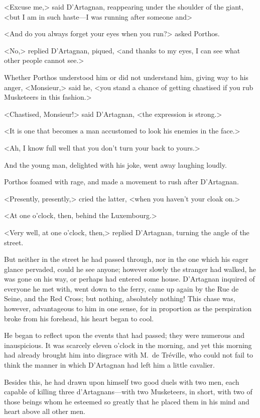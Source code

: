 <Excuse me,> said D'Artagnan, reappearing under the shoulder of the giant, <but I am in such haste—I was running after someone and\longdash> 

<And do you always forget your eyes when you run?> asked Porthos. 

<No,> replied D'Artagnan, piqued, <and thanks to my eyes, I can see what other people cannot see.> 

Whether Porthos understood him or did not understand him, giving way to his anger, <Monsieur,> said he, <you stand a chance of getting chastised if you rub Musketeers in this fashion.> 

<Chastised, Monsieur!> said D'Artagnan, <the expression is strong.> 

<It is one that becomes a man accustomed to look his enemies in the face.> 

<Ah,  I know full well that you don't turn your back to yours.> 

And the young man, delighted with his joke, went away laughing loudly. 

Porthos foamed with rage, and made a movement to rush after D'Artagnan. 

<Presently, presently,> cried the latter, <when you haven't your cloak on.> 

<At one o'clock, then, behind the Luxembourg.> 

<Very well, at one o'clock, then,> replied D'Artagnan, turning the angle of the street. 

But neither in the street he had passed through, nor in the one which his eager glance pervaded, could he see anyone; however slowly the stranger had walked, he was gone on his way, or perhaps had entered some house. D'Artagnan inquired of everyone he met with, went down to the ferry, came up again by the Rue de Seine, and the Red Cross; but nothing, absolutely nothing! This chase was, however, advantageous to him in one sense, for in proportion as the perspiration broke from his forehead, his heart began to cool. 

He began to reflect upon the events that had passed; they were numerous and inauspicious. It was scarcely eleven o'clock in the morning, and yet this morning had already brought him into disgrace with M.~de Tréville, who could not fail to think the manner in which D'Artagnan had left him a little cavalier. 

Besides this, he had drawn upon himself two good duels with two men, each capable of killing three d'Artagnans—with two Musketeers, in short, with two of those beings whom he esteemed so greatly that he placed them in his mind and heart above all other men. 

